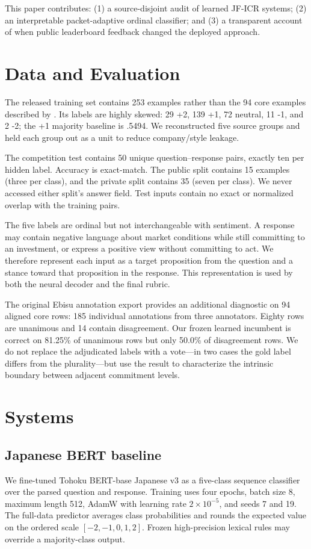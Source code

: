 \documentclass[11pt]{article}
\begin{document}
This paper contributes: (1) a source-disjoint audit of learned JF-ICR systems; (2) an interpretable packet-adaptive ordinal classifier; and (3) a transparent account of when public leaderboard feedback changed the deployed approach.

\section{Data and Evaluation}
The released training set contains 253 examples rather than the 94 core examples described by \citet{peng-etal-2026-ebisu}. Its labels are highly skewed: 29 +2, 139 +1, 72 neutral, 11 -1, and 2 -2; the +1 majority baseline is .5494. We reconstructed five source groups and held each group out as a unit to reduce company/style leakage.

The competition test contains 50 unique question--response pairs, exactly ten per hidden label. Accuracy is exact-match. The public split contains 15 examples (three per class), and the private split contains 35 (seven per class). We never accessed either split's answer field. Test inputs contain no exact or normalized overlap with the training pairs.

The five labels are ordinal but not interchangeable with sentiment.  A response
may contain negative language about market conditions while still committing
to an investment, or express a positive view without committing to act.  We
therefore represent each input as a target proposition from the question and a
stance toward that proposition in the response.  This representation is used
by both the neural decoder and the final rubric.

The original Ebisu annotation export provides an additional diagnostic on 94
aligned core rows: 185 individual annotations from three annotators.  Eighty
rows are unanimous and 14 contain disagreement.  Our frozen learned incumbent
is correct on 81.25\% of unanimous rows but only 50.0\% of disagreement rows.
We do not replace the adjudicated labels with a vote---in two cases the gold
label differs from the plurality---but use the result to characterize the
intrinsic boundary between adjacent commitment levels.

\section{Systems}
\subsection{Japanese BERT baseline}
We fine-tuned Tohoku BERT-base Japanese v3 as a five-class sequence classifier over the parsed question and response. Training uses four epochs, batch size 8, maximum length 512, AdamW with learning rate $2\times10^{-5}$, and seeds 7 and 19. The full-data predictor averages class probabilities and rounds the expected value on the ordered scale $[-2,-1,0,1,2]$. Frozen high-precision lexical rules may override a majority-class output.
\end{document}
